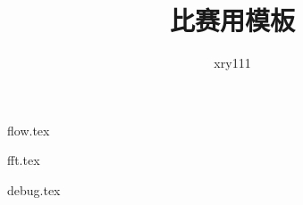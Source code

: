 \documentclass{article}
\title{比赛用模板}
\author{xry111}
\begin{document}
\maketitle

\tableofcontents

{flow.tex}




{fft.tex}




\graphicspath{{./debug/}}
{debug.tex}
\end{document}
